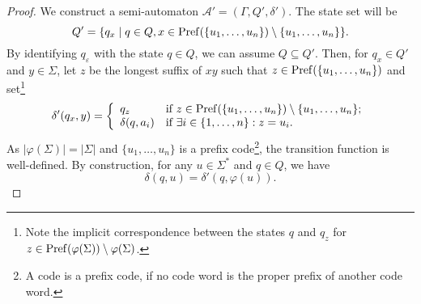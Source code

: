 \begin{proof}
  We construct a semi-automaton $\mathcal A' = (\Gamma, Q', \delta')$.
  The state set will be
  \[
   Q' = \{ q_x \mid q \in Q, x \in \operatorname{Pref}(\{ u_1,\ldots,u_n \}) \setminus \{ u_1,\ldots,u_n \} \}. 
  \]
  By identifying $q_{\varepsilon}$ with the state $q \in Q$,
  we can assume $Q \subseteq Q'$.
  Then, for $q_x \in Q'$ and $y \in \Sigma$, 
  let $z$ be the longest suffix of $xy$
  such that $z \in \operatorname{Pref}(\{ u_1,\ldots,u_n\})$ and set\footnote{Note
  the implicit correspondence between the states $q$
  and $q_z$ for $z \in \operatorname{Pref}(\varphi(\Sigma)) \setminus \varphi(\Sigma)$.}
  \begin{equation}\label{eqn:def_delta_bar}
   \delta'(q_x, y) = \left\{
   \begin{array}{ll} %
    q_{z}          & \mbox{if } z \in \pref(\{ u_1,\ldots,u_n\}) \setminus \{ u_1, \ldots, u_n \}; \\ 
    \delta(q, a_i)  & \mbox{if } \exists i \in \{ 1, \ldots, n \} : z = u_i.
   \end{array}
   \right.
  \end{equation}
  As $|\varphi(\Sigma)| = |\Sigma|$ and $\{ u_1, \ldots, u_n \}$ is a prefix code\footnote{A code
  is a prefix code, if no code word is the proper prefix of another code word.}, the transition function %
  is well-defined.
  By construction, for any $u \in \Sigma^*$ and $q \in Q$,
  we have  
  \begin{equation}\label{eqn:comma_free_reduction}
      \delta(q, u) = \delta'(q, \varphi(u)).
  \end{equation}
  
  
  
  
\begin{comment}  
  But we need a more precise statement.
  

\end{comment}
\end{proof}
